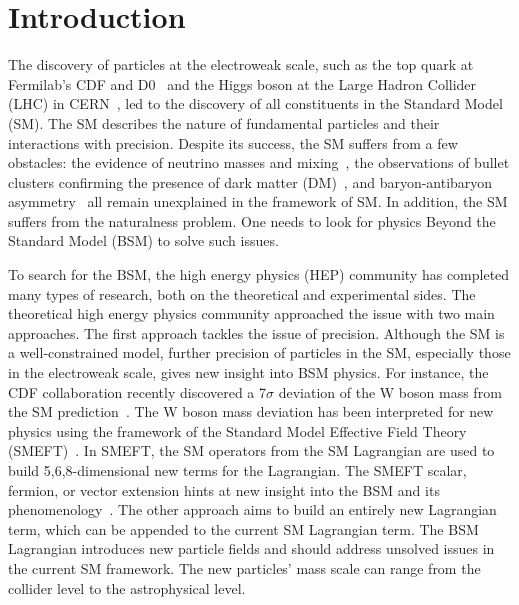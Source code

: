\chapter{Introduction}\label{sec:introduction}

The discovery of particles at the electroweak scale, such as the top quark at Fermilab's CDF and D0~\cite{topD0,topCDF} and the Higgs boson at the Large Hadron Collider (LHC) in CERN~\cite{higgscms,higgsatlas}, led to the discovery of all constituents in the Standard Model (SM).
The SM describes the nature of fundamental particles and their interactions with precision.
Despite its success, the SM suffers from a few obstacles:
the evidence of neutrino masses and mixing~\cite{neutrino}, the observations of bullet clusters confirming the presence of dark matter (DM)~\cite{Baumgart:2009tn,Kaplan:2009ag,Chan:2011aa,Dienes:2011ja,Dienes:2012yz}, and baryon-antibaryon asymmetry~\cite{Cui:2014twa} all remain unexplained in the framework of SM.
In addition, the SM suffers from the naturalness problem.
One needs to look for physics Beyond the Standard Model (BSM) to solve such issues.

To search for the BSM, the high energy physics (HEP) community has completed many types of research, both on the theoretical and experimental sides.
The theoretical high energy physics community approached the issue with two main approaches.
The first approach tackles the issue of precision.
Although the SM is a well-constrained model, further precision of particles in the SM, especially those in the electroweak scale, gives new insight into BSM physics.
For instance, the CDF collaboration recently discovered a 7$\sigma$ deviation of the W boson mass from the SM prediction~\cite{Aaltonen:2022aaa}.
The W boson mass deviation has been interpreted for new physics using the framework of the Standard Model Effective Field Theory (SMEFT)~\cite{Mishima:2022aab}.
In SMEFT, the SM operators from the SM Lagrangian are used to build 5,6,8-dimensional new terms for the Lagrangian.
The SMEFT scalar, fermion, or vector extension hints at new insight into the BSM and its phenomenology~\cite{Mishima:2022aab}.
The other approach aims to build an entirely new Lagrangian term, which can be appended to the current SM Lagrangian term.
The BSM Lagrangian introduces new particle fields and should address unsolved issues in the current SM framework.
The new particles' mass scale can range from the collider level to the astrophysical level.






